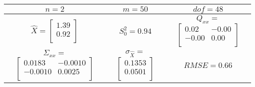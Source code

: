 \begin{table}[H]
\centering
\begin{tabular}{|c|c|c|}
\toprule
$n = 2$& %
$m = 50$& %
$dof = 48$\\ %
\midrule
$\hat{X} = $$
 \begin{bmatrix}
1.39\\
0.92\\
\end{bmatrix}
$
& %
$S_0^2 = 0.94$ & %
$Q_{xx} = $ $
 \begin{bmatrix}
0.02&-0.00\\
-0.00&0.00\\
\end{bmatrix}
$
\\ %
\midrule
$\Sigma_{xx} = $ $
 \begin{bmatrix}
0.0183&-0.0010\\
-0.0010&0.0025\\
\end{bmatrix}
$
& %
$\sigma_{\hat{X}} = $ $
 \begin{bmatrix}
0.1353\\
0.0501\\
\end{bmatrix}
$
& %
$RMSE = 0.66$\\ %
\bottomrule
\end{tabular}
\end{table}
